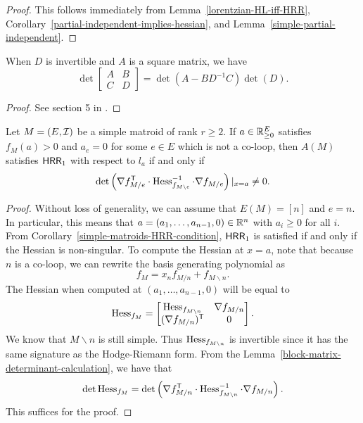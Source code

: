 \documentclass{puthesis-UG}
\begin{document}
\begin{proof}
	This follows immediately from Lemma~\ref{lorentzian-HL-iff-HRR}, Corollary~\ref{partial-independent-implies-hessian}, and Lemma~\ref{simple-partial-independent}.
\end{proof}

\begin{lem} \label{block-matrix-determinant-calculation}
		When $D$ is invertible and $A$ is a square matrix, we have
		\[
			\det \begin{bmatrix} A & B \\ C & D \end{bmatrix} = \det (A - B D^{-1} C) \det (D).
		\]
	\end{lem}
	\begin{proof}
		See section 5 in \cite{block-matrices}.
	\end{proof}

\begin{thm}
	Let $M = (E, \mathcal{I})$ be a simple matroid of rank $r \geq 2$. If $a \in \mathbb{R}_{\geq 0}^E$ satisfies $f_M(a) > 0$ and $a_e = 0$ for some $e \in E$ which is not a co-loop, then $A(M)$ satisfies $\mathsf{HRR}_1$ with respect to $l_a$ if and only if 
	\[
		\det \left ( \nabla f_{M / e}^{\mathsf{T}} \cdot \operatorname{Hess}^{-1}_{f_{M \backslash e}} \cdot \nabla f_{M / e} \right ) |_{x = a} \neq 0.
	\]
\end{thm}

\begin{proof}
	Without loss of generality, we can assume that $E(M) = [n]$ and $e = n$. In particular, this means that $a = (a_1, \ldots, a_{n-1}, 0) \in \mathbb{R}^n$ with $a_i \geq 0$ for all $i$. From Corollary~\ref{simple-matroids-HRR-condition}, $\mathsf{HRR}_1$ is satisfied if and only if the Hessian is non-singular. To compute the Hessian at $x = a$, note that because $n$ is a co-loop, we can rewrite the basis generating polynomial as 
	\[
		f_M = x_n f_{M / n} + f_{M \backslash n}.
	\]
	The Hessian when computed at $(a_1, \ldots, a_{n-1}, 0)$ will be equal to 
	\[
		\operatorname{Hess}_{f_M} = \begin{bmatrix}
			\operatorname{Hess}_{f_{M \backslash n}} & \nabla f_{M/n} \\
			(\nabla f_{M/n})^{\mathsf{T}} & 0
		\end{bmatrix}.
	\]
	We know that $M \backslash n$ is still simple. Thus $\operatorname{Hess}_{f_{M \backslash n}}$ is invertible since it has the same signature as the Hodge-Riemann form. From the Lemma~\ref{block-matrix-determinant-calculation}, we have that
	\[
		\det \operatorname{Hess}_{f_M} = \det \left ( \nabla f_{M / n}^{\mathsf{T}} \cdot \operatorname{Hess}^{-1}_{f_{M \backslash n}} \cdot \nabla f_{M / n} \right ).
	\]
	This suffices for the proof. 
\end{proof}
\end{document}
